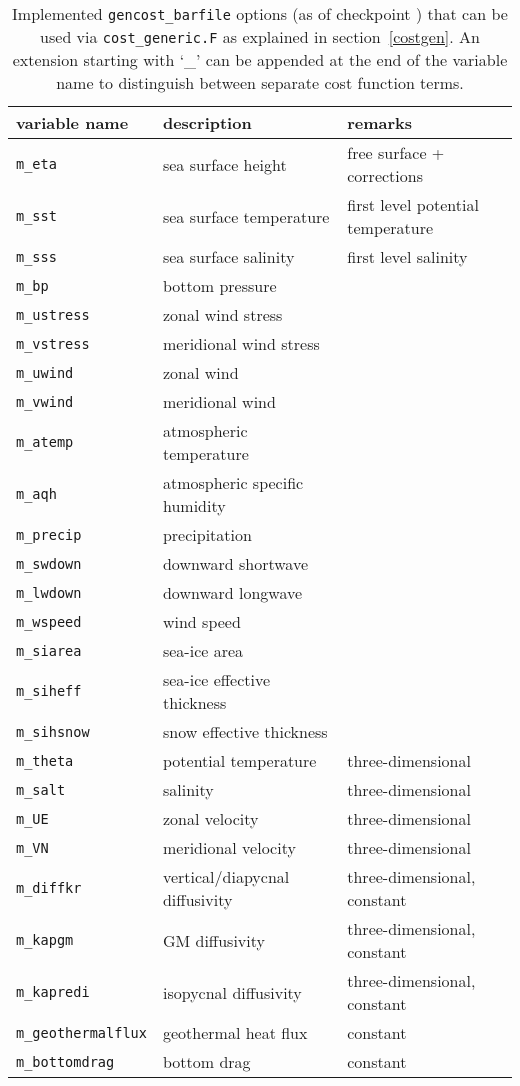 \begin{table}[!ht]
\centering
\begin{tabular}{lll}
variable name				&	description						&	remarks \\ \hline\hline
\texttt{m\_eta}				&	sea surface height				&	free surface + corrections \\
\texttt{m\_sst}				&	sea surface temperature			&	first level potential temperature \\
\texttt{m\_sss}				&	sea surface salinity			&	first level salinity \\ 
\texttt{m\_bp}				&	bottom pressure					& \\ \hline
\texttt{m\_ustress}			&	zonal wind stress				& \\
\texttt{m\_vstress}			&	meridional wind stress			& \\
\texttt{m\_uwind}			&	zonal wind 						& \\
\texttt{m\_vwind}			&	meridional wind 				& \\
\texttt{m\_atemp}			&	atmospheric temperature			& \\
\texttt{m\_aqh}				&	atmospheric specific humidity	& \\
\texttt{m\_precip}			&	precipitation					& \\
\texttt{m\_swdown}			&	downward shortwave				& \\
\texttt{m\_lwdown}			&	downward longwave				& \\
\texttt{m\_wspeed}			&	wind speed						& \\ \hline
\texttt{m\_siarea}			&	sea-ice area					& \\
\texttt{m\_siheff}			&	sea-ice effective thickness		& \\
\texttt{m\_sihsnow}			&	snow effective thickness		& \\ \hline
\texttt{m\_theta}			&	potential temperature			& three-dimensional \\
\texttt{m\_salt}			&	salinity						& three-dimensional \\
\texttt{m\_UE}				&	zonal velocity					& three-dimensional \\
\texttt{m\_VN}				&	meridional velocity				& three-dimensional \\ \hline
\texttt{m\_diffkr}			&	vertical/diapycnal diffusivity	& three-dimensional, constant \\ 
\texttt{m\_kapgm}			&	GM diffusivity					& three-dimensional, constant \\ 
\texttt{m\_kapredi}			&	isopycnal diffusivity			& three-dimensional, constant \\ 
\texttt{m\_geothermalflux}	&	geothermal heat flux			& constant \\ 
\texttt{m\_bottomdrag}		&	bottom drag						& constant \\
\end{tabular}
\caption{Implemented \texttt{gencost\_barfile} options (as of checkpoint \mitgcmCheckpointVersion) that can be used via \texttt{cost\_generic.F} as explained in section~\ref{costgen}. An extension starting with `\_' can be appended at the end of the variable name to distinguish between separate cost function terms.}
\label{tbl:gencost_ecco_barfile}
\end{table}

